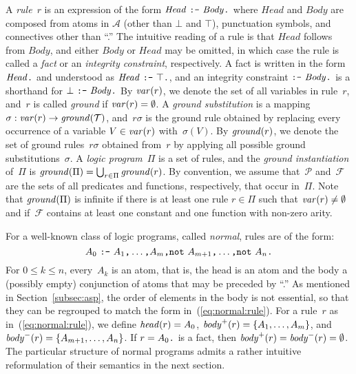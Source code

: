 A \emph{rule}~$r$ is an expression of the form $\mathit{Head}~\texttt{:-}~\mathit{Body}\texttt{.}$
where $\mathit{Head}$ and $\mathit{Body}$ are composed from atoms in $\mathcal{A}$
(other than $\bot$ and $\top$), punctuation symbols, and connectives other than ``\code{:-}.''
The intuitive reading of a rule is that $\mathit{Head}$ follows from $\mathit{Body}$,
and either $\mathit{Body}$ or $\mathit{Head}$ may be omitted, in which case the
rule is called a \emph{fact} or an \emph{integrity constraint}, respectively.
A fact is written in the form $\mathit{Head}\texttt{.}$ and understood as 
$\mathit{Head}~\texttt{:-}~\top\texttt{.}$, and an integrity constraint
$\texttt{:-}~\mathit{Body}\texttt{.}$ is a shorthand for $\bot~\texttt{:-}~\mathit{Body}\texttt{.}$
By $\mathit{var}(r)$, we denote the set of all variables in rule~$r$,
and~$r$ is called \emph{ground} if $\mathit{var}(r)=\emptyset$.
A \emph{ground substitution} is a mapping $\sigma:\mathit{var}(r)\rightarrow\mathit{ground}(\mathcal{T})$,
and~$r\sigma$ is the ground rule obtained by replacing every occurrence of a
variable $V\in\mathit{var}(r)$ with~$\sigma(V)$.
By $\mathit{ground}(r)$, we denote the set of ground rules~$r\sigma$
obtained from~$r$ by applying all possible ground substitutions~$\sigma$.
A \emph{logic program}~$\Pi$ is a set of rules,
and the \emph{ground instantiation} of~$\Pi$ is
$\mathit{ground}(\Pi)=\bigcup_{r\in\Pi}\mathit{ground}(r)$.
By convention, we assume that~$\mathcal{P}$ and~$\mathcal{F}$ are the sets
of all predicates and functions, respectively, that occur in~$\Pi$.
Note that $\mathit{ground}(\Pi)$ is infinite if
there is at least one rule $r\in\Pi$ such that $\mathit{var}(r)\neq\emptyset$ and 
if~$\mathcal{F}$ contains at least one constant and one function
with non-zero arity.

For a well-known class of logic programs, called \emph{normal},
rules are of the form:
\begin{equation}\label{eq:normal:rule}
  A_0~\texttt{:-}~A_1\texttt{,}\dots\texttt{,}A_m\texttt{,}
  \texttt{not}~A_{m+1}\texttt{,}\dots\texttt{,}\texttt{not}~A_n\texttt{.}
\end{equation}
%
For $0\leq k\leq n$, every~$A_k$ is an atom, that is, the head is an atom and
the body a (possibly empty) conjunction of atoms that may be preceded by ``.''
As mentioned in Section~\ref{subsec:asp},
the order of elements in the body is not essential,
so that they can be regrouped to match the form in~(\ref{eq:normal:rule}).
For a rule~$r$ as in~(\ref{eq:normal:rule}), we define 
$\mathit{head}(r)=A_0$, $\mathit{body}^+(r)=\{A_1,\dots,A_m\}$, and $\mathit{body}^-(r)=\{A_{m+1},\dots,A_n\}$.
If $r=A_0\texttt{.}$ is a fact, then
$\pbody{r}=\nbody{r}=\nolinebreak\emptyset$.
The particular structure of normal programs admits a rather intuitive 
reformulation of their semantics in the next section.

